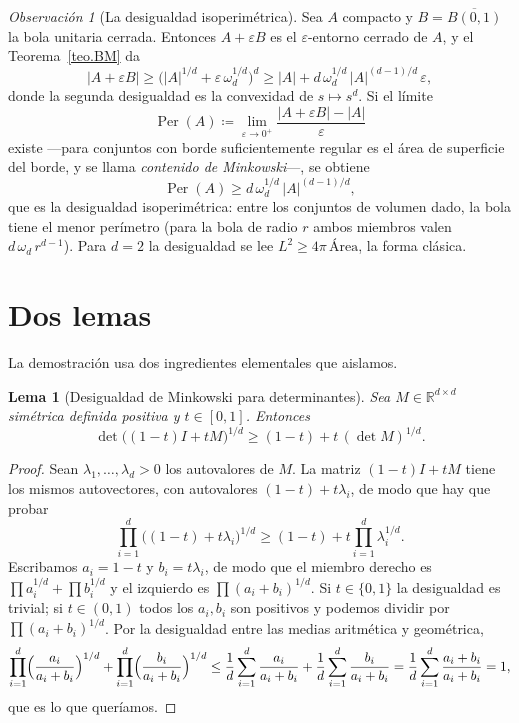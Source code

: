 \documentclass[12pt, a4paper]{amsbook}
\newcommand{\R}{{\mathbb R}}
\newtheorem{lema}[teo]{Lema}
\theoremstyle{remark}
\newtheorem{obs}[teo]{Observación}
\theoremstyle{definition}
\numberwithin{section}{chapter}
\numberwithin{subsection}{section}
\numberwithin{equation}{section}
\numberwithin{figure}{chapter}
\begin{document}
\begin{obs}[La desigualdad isoperimétrica]\label{obs.isoperimetrica}
Sea $A$ compacto y $B=\overline{B(0,1)}$ la bola unitaria cerrada. Entonces
$A+\varepsilon B$ es el $\varepsilon$-entorno cerrado de $A$, y el
Teorema~\ref{teo.BM} da
\[
|A+\varepsilon B|\ge\bigl(|A|^{1/d}+\varepsilon\,\omega_d^{1/d}\bigr)^d
\ge|A|+d\,\omega_d^{1/d}\,|A|^{(d-1)/d}\,\varepsilon,
\]
donde la segunda desigualdad es la convexidad de $s\mapsto s^d$. Si el
límite
\[
\operatorname{Per}(A)\coloneqq\lim_{\varepsilon\to0^+}\frac{|A+\varepsilon B|-|A|}{\varepsilon}
\]
existe —para conjuntos con borde suficientemente regular es el área de
superficie del borde, y se llama \emph{contenido de Minkowski}—, se obtiene
\[
\operatorname{Per}(A)\ge d\,\omega_d^{1/d}\,|A|^{(d-1)/d},
\]
que es la desigualdad isoperimétrica: entre los conjuntos de volumen dado,
la bola tiene el menor perímetro (para la bola de radio $r$ ambos miembros
valen $d\,\omega_d\,r^{d-1}$). Para $d=2$ la desigualdad se lee
$L^2\ge4\pi\,\text{Área}$, la forma clásica.
\end{obs}

\section{Dos lemas}\label{sec.BM.lemas}

La demostración usa dos ingredientes elementales que aislamos.

\begin{lema}[Desigualdad de Minkowski para determinantes]\label{lema.det.concavo}
Sea $M\in\R^{d\times d}$ simétrica definida positiva y $t\in[0,1]$. Entonces
\[
\det\bigl((1-t)I+tM\bigr)^{1/d}\ge(1-t)+t\,(\det M)^{1/d}.
\]
\end{lema}

\begin{proof}
Sean $\lambda_1,\dots,\lambda_d>0$ los autovalores de $M$. La matriz
$(1-t)I+tM$ tiene los mismos autovectores, con autovalores
$(1-t)+t\lambda_i$, de modo que hay que probar
\[
\prod_{i=1}^d\bigl((1-t)+t\lambda_i\bigr)^{1/d}\ge(1-t)+t\prod_{i=1}^d\lambda_i^{1/d}.
\]
Escribamos $a_i=1-t$ y $b_i=t\lambda_i$, de modo que el miembro derecho es
$\prod a_i^{1/d}+\prod b_i^{1/d}$ y el izquierdo es $\prod(a_i+b_i)^{1/d}$.
Si $t\in\{0,1\}$ la desigualdad es trivial; si $t\in(0,1)$ todos los $a_i,b_i$
son positivos y podemos dividir por $\prod(a_i+b_i)^{1/d}$. Por la
desigualdad entre las medias aritmética y geométrica,
\[
\prod_{i=1}^d\Bigl(\frac{a_i}{a_i+b_i}\Bigr)^{1/d}
+\prod_{i=1}^d\Bigl(\frac{b_i}{a_i+b_i}\Bigr)^{1/d}
\le\frac1d\sum_{i=1}^d\frac{a_i}{a_i+b_i}+\frac1d\sum_{i=1}^d\frac{b_i}{a_i+b_i}
=\frac1d\sum_{i=1}^d\frac{a_i+b_i}{a_i+b_i}=1,
\]
que es lo que queríamos.
\end{proof}
\end{document}
